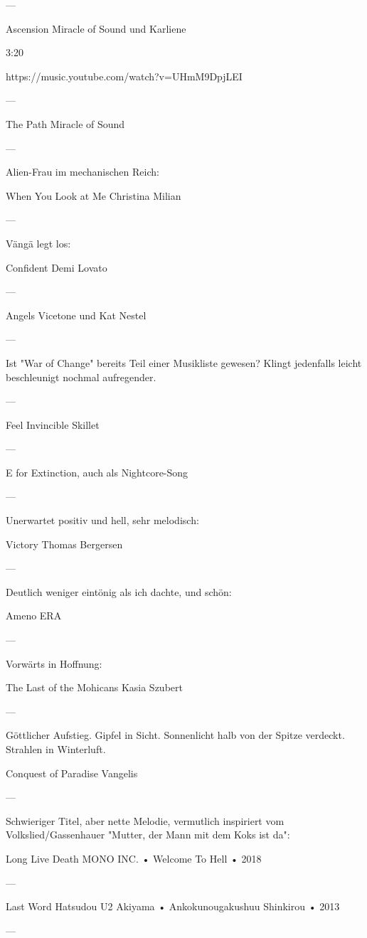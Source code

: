 —

Ascension
Miracle of Sound und Karliene

3:20

https://music.youtube.com/watch?v=UHmM9DpjLEI

—

The Path
Miracle of Sound

—

Alien-Frau im mechanischen Reich:

When You Look at Me
Christina Milian

—

Vängä legt los:

Confident
Demi Lovato

—

Angels
Vicetone und Kat Nestel

—

Ist "War of Change" bereits Teil einer Musikliste gewesen? Klingt jedenfalls leicht beschleunigt nochmal aufregender.

—

Feel Invincible
Skillet

—

E for Extinction, auch als Nightcore-Song

—

Unerwartet positiv und hell, sehr melodisch:

Victory
Thomas Bergersen

—

Deutlich weniger eintönig als ich dachte, und schön:

Ameno
ERA

—

Vorwärts in Hoffnung:

The Last of the Mohicans
Kasia Szubert

—

Göttlicher Aufstieg. Gipfel in Sicht. Sonnenlicht halb von der Spitze verdeckt. Strahlen in Winterluft.

Conquest of Paradise
Vangelis

—

Schwieriger Titel, aber nette Melodie, vermutlich inspiriert vom Volkslied/Gassenhauer "Mutter, der Mann mit dem Koks ist da":

Long Live Death
MONO INC.
 •
Welcome To Hell
 •
2018

—

Last Word Hatsudou
U2 Akiyama
 •
Ankokunougakushuu Shinkirou
 •
2013

—

